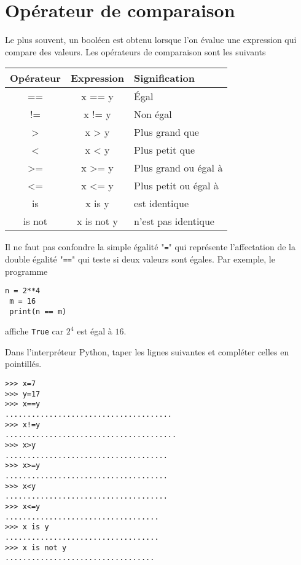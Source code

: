 \documentclass[11pt, a4paper]{book}
\begin{document}
\section{Opérateur de comparaison}
Le plus souvent, un booléen est obtenu lorsque l'on évalue une expression qui compare des valeurs.  Les opérateurs de comparaison sont les suivants
		\begin{center}
	\begin{tabular}{|c|c|l|}
		\hline
		Opérateur & Expression  & Signification  \\ \hline
		==&      x == y&          Égal   \\ \hline
		!=&     x  != y&          Non égal   \\ \hline
		>&       x > y &         Plus grand que   \\ \hline
		<&      x < y &          Plus petit que   \\ \hline
		>=&      x >= y&         Plus grand ou égal à   \\ \hline
		<=&      x <= y&         Plus petit ou égal à  \\ \hline
		is&       x is y&        est identique  \\ \hline
	  is not&     x is not y&    n’est pas identique   \\ \hline
		
	\end{tabular}
\end{center}
\begin{important}
	Il ne faut pas confondre la simple égalité "\lstinline{=}" qui représente l'affectation de la double égalité "\lstinline{==}" qui teste si deux valeurs sont égales. Par exemple, le programme
	\begin{lstlisting}[numbers=none]
 n = 2**4
 m = 16
 print(n == m)
	\end{lstlisting}
    affiche \lstinline{True} car $2^4$ est égal à $16$.
\end{important}

\exo Dans l'interpréteur Python, taper les lignes suivantes et compléter celles en pointillés.
\begin{lstlisting}[numbers=none]
>>> x=7 
>>> y=17 
>>> x==y
......................................
>>> x!=y
....................................... 
>>> x>y 
..................................... 
>>> x>=y 
..................................... 
>>> x<y 
..................................... 
>>> x<=y 
................................... 
>>> x is y 
................................... 
>>> x is not y 
..................................
\end{lstlisting}
\end{document}

